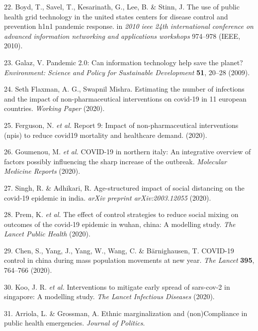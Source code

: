 \documentclass[]{article}
\begin{document}
\leavevmode\hypertarget{ref-boyd2010use}{}%
22. Boyd, T., Savel, T., Kesarinath, G., Lee, B. \& Stinn, J. The use of public health grid technology in the united states centers for disease control and prevention h1n1 pandemic response. in \emph{2010 ieee 24th international conference on advanced information networking and applications workshops} 974--978 (IEEE, 2010).

\leavevmode\hypertarget{ref-galaz2009pandemic}{}%
23. Galaz, V. Pandemic 2.0: Can information technology help save the planet? \emph{Environment: Science and Policy for Sustainable Development} \textbf{51}, 20--28 (2009).

\leavevmode\hypertarget{ref-flaxman2020}{}%
24. Seth Flaxman, A. G., Swapnil Mishra. Estimating the number of infections and the impact of non-pharmaceutical interventions on covid-19 in 11 european countries. \emph{Working Paper} (2020).

\leavevmode\hypertarget{ref-ferguson2020report}{}%
25. Ferguson, N. \emph{et al.} Report 9: Impact of non-pharmaceutical interventions (npis) to reduce covid19 mortality and healthcare demand. (2020).

\leavevmode\hypertarget{ref-goumenou2020covid}{}%
26. Goumenou, M. \emph{et al.} COVID-19 in northern italy: An integrative overview of factors possibly influencing the sharp increase of the outbreak. \emph{Molecular Medicine Reports} (2020).

\leavevmode\hypertarget{ref-singh2020age}{}%
27. Singh, R. \& Adhikari, R. Age-structured impact of social distancing on the covid-19 epidemic in india. \emph{arXiv preprint arXiv:2003.12055} (2020).

\leavevmode\hypertarget{ref-prem2020effect}{}%
28. Prem, K. \emph{et al.} The effect of control strategies to reduce social mixing on outcomes of the covid-19 epidemic in wuhan, china: A modelling study. \emph{The Lancet Public Health} (2020).

\leavevmode\hypertarget{ref-chen2020covid}{}%
29. Chen, S., Yang, J., Yang, W., Wang, C. \& Bärnighausen, T. COVID-19 control in china during mass population movements at new year. \emph{The Lancet} \textbf{395}, 764--766 (2020).

\leavevmode\hypertarget{ref-koo2020interventions}{}%
30. Koo, J. R. \emph{et al.} Interventions to mitigate early spread of sars-cov-2 in singapore: A modelling study. \emph{The Lancet Infectious Diseases} (2020).

\leavevmode\hypertarget{ref-arriola2020}{}%
31. Arriola, L. \& Grossman, A. Ethnic marginalization and (non)Compliance in public health emergencies. \emph{Journal of Politics}.
\end{document}
